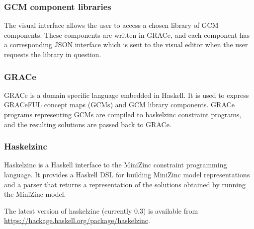 
\subsubsection*{GCM component libraries}

The visual interface allows the user to access a chosen library of GCM
components.
%
These components are written in GRACe, and each component has a
corresponding JSON interface which is sent to the visual editor when
the user requests the library in question.

\subsubsection*{GRACe}

GRACe is a domain specific language embedded in Haskell.
%
It is used to express GRACeFUL concept maps (GCMs) and GCM library
components.
%
GRACe programs representing GCMs are compiled to haskelzinc constraint
programs, and the resulting solutions are passed back to GRACe.

\subsubsection*{Haskelzinc}

Haskelzinc is a Haskell interface to the MiniZinc constraint
programming language.
%
It provides a Haskell DSL for building MiniZinc model representations and a parser that returns a representation of the solutions obtained
by running the MiniZinc model.

The latest version of haskelzinc (currently 0.3) is available from
\url{https://hackage.haskell.org/package/haskelzinc}.

